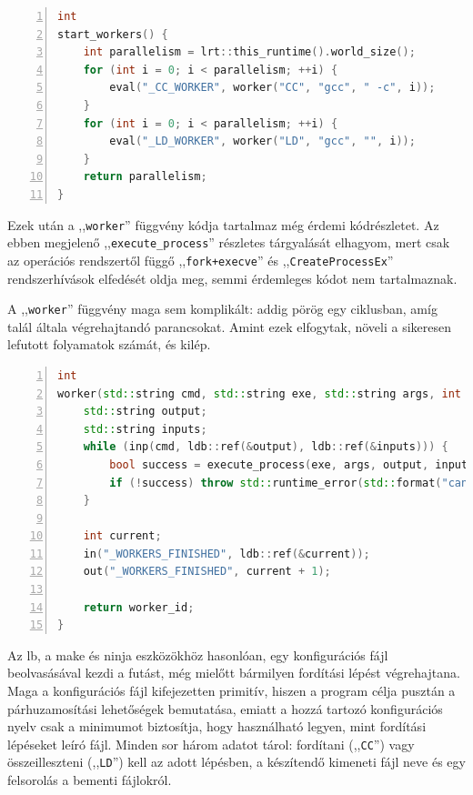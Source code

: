 \begin{lstlisting}[numbers=left, language=C++, label=lst:lb-startworkers, caption={Az fordító folyamatok indítása}]
int 
start_workers() {
	int parallelism = lrt::this_runtime().world_size();
	for (int i = 0; i < parallelism; ++i) {
		eval("_CC_WORKER", worker("CC", "gcc", " -c", i));
	}
	for (int i = 0; i < parallelism; ++i) {
		eval("_LD_WORKER", worker("LD", "gcc", "", i));
	}
	return parallelism;
}
\end{lstlisting}

Ezek után a ,,\texttt{worker}'' függvény kódja tartalmaz még érdemi kódrészletet.
Az ebben megjelenő ,,\texttt{execute\_process}'' részletes tárgyalását elhagyom, mert csak az operációs rendszertől függő ,,\texttt{fork+execve}'' és ,,\texttt{CreateProcessEx}'' rendszerhívások elfedését oldja meg, semmi érdemleges kódot nem tartalmaznak.

A ,,\texttt{worker}'' függvény maga sem komplikált: addig pörög egy ciklusban, amíg talál általa végrehajtandó parancsokat.
Amint ezek elfogytak, növeli a sikeresen lefutott folyamatok számát, és kilép.

\begin{lstlisting}[numbers=left, language=C++, label=lst:lb-worker, caption={A futtató folyamat}]
int
worker(std::string cmd, std::string exe, std::string args, int worker_id) {
	std::string output;
	std::string inputs;
	while (inp(cmd, ldb::ref(&output), ldb::ref(&inputs))) {
		bool success = execute_process(exe, args, output, inputs);
		if (!success) throw std::runtime_error(std::format("cannot run({}): {} {} -o {} {}", worker_id, exec, args, output, inputs))
	}
	
	int current;
	in("_WORKERS_FINISHED", ldb::ref(&current));
	out("_WORKERS_FINISHED", current + 1);
	
	return worker_id;
}
\end{lstlisting}


Az lb, a make és ninja eszközökhöz hasonlóan, egy konfigurációs fájl beolvasásával kezdi a futást, még mielőtt bármilyen fordítási lépést végrehajtana.
Maga a konfigurációs fájl kifejezetten primitív, hiszen a program célja pusztán a párhuzamosítási lehetőségek bemutatása, emiatt a hozzá tartozó konfigurációs nyelv csak a minimumot biztosítja, hogy használható legyen, mint fordítási lépéseket leíró fájl.
Minden sor három adatot tárol: fordítani (,,\texttt{CC}'') vagy összeilleszteni (,,\texttt{LD}'') kell az adott lépésben, a készítendő kimeneti fájl neve és egy felsorolás a bementi fájlokról.

